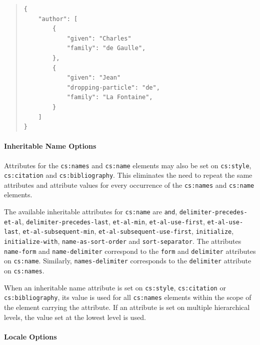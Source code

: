 \begin{quote}
\begin{verbatim}
{
    "author": [
        {
            "given": "Charles"
            "family": "de Gaulle",
        },
        {
            "given": "Jean"
            "dropping-particle": "de",
            "family": "La Fontaine",
        }
    ]
}
\end{verbatim}
\end{quote}

\hypertarget{inheritable-name-options}{%
\paragraph{Inheritable Name Options}\label{inheritable-name-options}}

Attributes for the \texttt{cs:names} and \texttt{cs:name} elements may
also be set on \texttt{cs:style}, \texttt{cs:citation} and
\texttt{cs:bibliography}. This eliminates the need to repeat the same
attributes and attribute values for every occurrence of the
\texttt{cs:names} and \texttt{cs:name} elements.

The available inheritable attributes for \texttt{cs:name} are
\texttt{and}, \texttt{delimiter-precedes-et-al},
\texttt{delimiter-precedes-last}, \texttt{et-al-min},
\texttt{et-al-use-first}, \texttt{et-al-use-last},
\texttt{et-al-subsequent-min}, \texttt{et-al-subsequent-use-first},
\texttt{initialize}, \texttt{initialize-with},
\texttt{name-as-sort-order} and \texttt{sort-separator}. The attributes
\texttt{name-form} and \texttt{name-delimiter} correspond to the
\texttt{form} and \texttt{delimiter} attributes on \texttt{cs:name}.
Similarly, \texttt{names-delimiter} corresponds to the
\texttt{delimiter} attribute on \texttt{cs:names}.

When an inheritable name attribute is set on \texttt{cs:style},
\texttt{cs:citation} or \texttt{cs:bibliography}, its value is used for
all \texttt{cs:names} elements within the scope of the element carrying
the attribute. If an attribute is set on multiple hierarchical levels,
the value set at the lowest level is used.

\hypertarget{locale-options}{%
\paragraph{Locale Options}\label{locale-options}}

